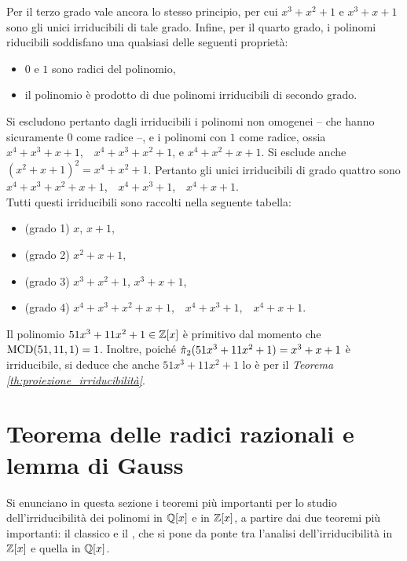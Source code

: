 \documentclass[11pt]{scrbook}
\begin{document}
Per il terzo grado vale ancora lo stesso principio, per cui
$x^3+x^2+1$ e $x^3+x+1$ sono gli unici irriducibili di tale grado.
Infine, per il quarto grado, i polinomi riducibili soddisfano
una qualsiasi delle seguenti proprietà:

\begin{itemize}
    \item $0$ e $1$ sono radici del polinomio,
    \item il polinomio è prodotto di due polinomi irriducibili di
          secondo grado.
\end{itemize}

Si escludono pertanto dagli irriducibili i polinomi non omogenei --
che hanno sicuramente $0$ come radice --, e i polinomi con $1$ come
radice, ossia $x^4+x^3+x+1$,\ \
$x^4+x^3+x^2+1$, e $x^4+x^2+x+1$. Si esclude anche
$(x^2+x+1)^2 = x^4+x^2+1$. Pertanto gli unici irriducibili di
grado quattro sono $x^4+x^3+x^2+x+1$,\ \ $x^4+x^3+1$,\ \  $x^4+x+1$. \\

Tutti questi irriducibili sono raccolti nella seguente tabella:

\begin{itemize}
    \item (grado 1) $x$, $x+1$,
    \item (grado 2) $x^2+x+1$,
    \item (grado 3) $x^3+x^2+1$, $x^3+x+1$,
    \item (grado 4) $x^4+x^3+x^2+x+1$,\ \ $x^4+x^3+1$,\ \ $x^4+x+1$.
\end{itemize}

\begin{example}
    Il polinomio $51x^3+11x^2+1 \in \mathbb{Z}[x]$ è primitivo dal momento
    che $\operatorname{MCD}(51, 11, 1)=1$. Inoltre, poiché $\hat{\pi}_2(51x^3+11x^2+1)=
        x^3+x+1$ è irriducibile, si deduce che anche $51x^3+11x^2+1$ lo
    è per il \textit{Teorema \ref{th:proiezione_irriducibilità}}.
\end{example}

\section{Teorema delle radici razionali e lemma di Gauss}

Si enunciano in questa sezione i teoremi più importanti per
lo studio dell'irriducibilità dei polinomi in $\mathbb{Q}[x]$ e
in $\mathbb{Z}[x]$, a partire dai due teoremi più importanti: il
classico  e il ,
che si pone da ponte tra l'analisi dell'irriducibilità in $\mathbb{Z}[x]$ e
quella in $\mathbb{Q}[x]$.
\end{document}
